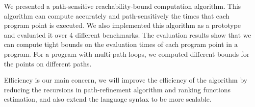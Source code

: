We presented a path-sensitive reachability-bound computation algorithm.
This algorithm can compute accurately and path-sensitively the times that each program point is executed.
We also implemented this algorithm as a prototype and evaluated it over 4 different benchmarks.
The evaluation results show that we can compute tight bounds on the evaluation times of each program point in a program. For a program with multi-path loops, we computed different bounds for the points on different paths.

Efficiency is our main concern, we will improve the efficiency of the algorithm by reducing the recursions in path-refinement algorithm and ranking functions estimation, and also extend the language syntax
to be more scalable.